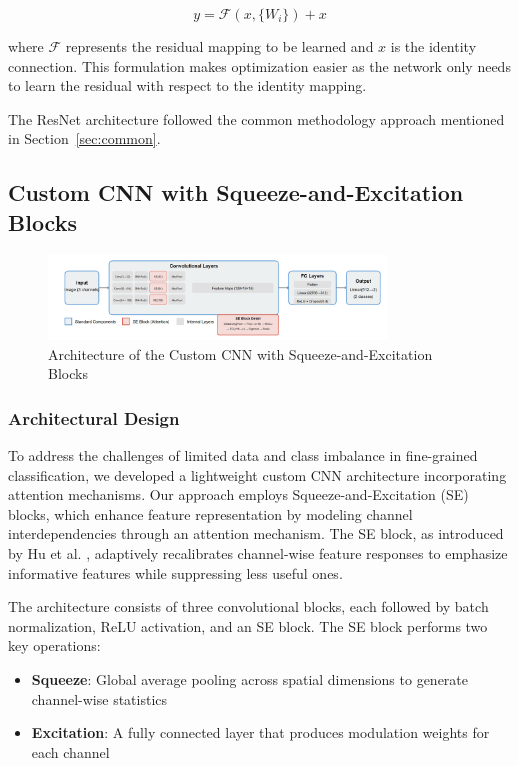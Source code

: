 \documentclass[a4paper,12pt]{report}
\begin{document}
\begin{equation}
y = \mathcal{F}(x, \{W_i\}) + x
\end{equation}

where $\mathcal{F}$ represents the residual mapping to be learned and $x$ is the identity connection. This formulation makes optimization easier as the network only needs to learn the residual with respect to the identity mapping.

The ResNet architecture followed the common methodology approach mentioned in Section~\ref{sec:common}.

\subsection{Custom CNN with Squeeze-and-Excitation Blocks}

\begin{figure}[H]
    \centering
    \includegraphics[width=0.8\textwidth]{images/architecture/improvedcnn.png}
    \caption{Architecture of the Custom CNN with Squeeze-and-Excitation Blocks}
    \label{fig:improvedcnn_architecture}
\end{figure}

\subsubsection{Architectural Design}

To address the challenges of limited data and class imbalance in fine-grained classification, we developed a lightweight custom CNN architecture incorporating attention mechanisms. Our approach employs Squeeze-and-Excitation (SE) blocks, which enhance feature representation by modeling channel interdependencies through an attention mechanism. The SE block, as introduced by Hu et al. \citep{Hu_2018_CVPR}, adaptively recalibrates channel-wise feature responses to emphasize informative features while suppressing less useful ones.

The architecture consists of three convolutional blocks, each followed by batch normalization, ReLU activation, and an SE block. The SE block performs two key operations:
\begin{itemize}
    \item \textbf{Squeeze}: Global average pooling across spatial dimensions to generate channel-wise statistics
    \item \textbf{Excitation}: A fully connected layer that produces modulation weights for each channel
\end{itemize}
\end{document}
